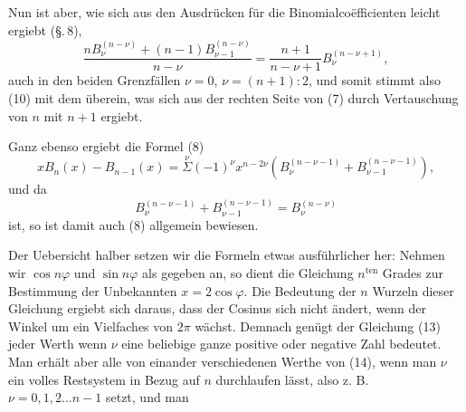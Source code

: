 Nun ist aber, wie sich aus den Ausdrücken für die Binomialco\"efficienten leicht ergiebt (\S.\,8),
\[
\dfrac{n B_\nu^{(n-\nu)} + (n-1) B_{\nu-1}^{(n-\nu)}}{n-\nu} = \dfrac{n+1}{n-\nu+1} B_\nu^{(n-\nu+1)},
\]
auch in den beiden Grenzfällen $\nu=0$, $\nu=(n+1):2$, und somit stimmt also (10) mit dem überein, was sich aus der rechten Seite von (7) durch Vertauschung von $n$ mit $n+1$ ergiebt.

Ganz ebenso ergiebt die Formel (8)
\[
x B_n(x) - B_{n-1}(x) = \overset{\nu}{\Sigma}(-1)^\nu x^{n-2\nu}\left(B_\nu^{(n-\nu-1)} + B_{\nu-1}^{(n-\nu-1)}\right),
\]
und da
\[
B_\nu^{(n-\nu-1)} + B_{\nu-1}^{(n-\nu-1)} = B_\nu^{(n-\nu)}
\]
ist, so ist damit auch (8) allgemein bewiesen.

Der Uebersicht halber setzen wir die Formeln etwas ausführlicher her:
Nehmen wir $\cos n\varphi$ und $\sin n\varphi$ als gegeben an, so dient die Gleichung $n^{\text{ten}}$ Grades
zur Bestimmung der Unbekannten $x = 2\cos\varphi$. Die Bedeutung der $n$ Wurzeln dieser Gleichung ergiebt sich daraus, dass der Cosinus sich nicht ändert, wenn der Winkel um ein Vielfaches von $2\pi$ wächst. Demnach genügt der Gleichung (13) jeder Werth
wenn $\nu$ eine beliebige ganze positive oder negative Zahl bedeutet. Man erhält aber alle von einander verschiedenen Werthe von (14), wenn man $\nu$ ein volles Restsystem in Bezug auf $n$ durchlaufen lässt, also z. B. $\nu = 0, 1, 2 \ldots n-1$ setzt, und man
